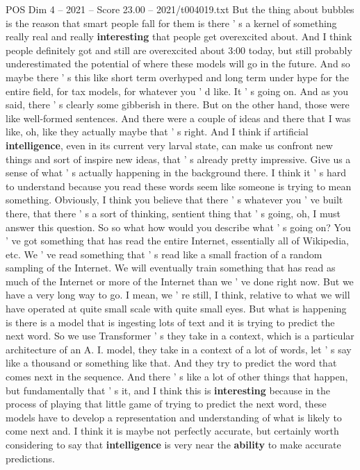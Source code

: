 \begin{textsample}{POS Dim 4 – 2021 – Score 23.00 – 2021/t004019.txt}
But the thing about bubbles is the reason that smart people fall for them is there ' s a kernel of something really real and really \textbf{interesting} that people get overexcited about.
And I think people definitely got and still are overexcited about 3:00 today, but still probably underestimated the potential of where these models will go in the future.
And so maybe there ' s this like short term overhyped and long term under hype for the entire field, for tax models, for whatever you ' d like.
It ' s going on.
And as you said, there ' s clearly some gibberish in there.
But on the other hand, those were like well-formed sentences.
And there were a couple of ideas and there that I was like, oh, like they actually maybe that ' s right.
And I think if artificial \textbf{intelligence}, even in its current very larval state, can make us confront new things and sort of inspire new ideas, that ' s already pretty impressive.
Give us a sense of what ' s actually happening in the background there.
I think it ' s hard to understand because you read these words seem like someone is trying to mean something.
Obviously, I think you believe that there ' s whatever you ' ve built there, that there ' s a sort of thinking, sentient thing that ' s going, oh, I must answer this question.
So so what how would you describe what ' s going on?
You ' ve got something that has read the entire Internet, essentially all of Wikipedia, etc.
We ' ve read something that ' s read like a small fraction of a random sampling of the Internet.
We will eventually train something that has read as much of the Internet or more of the Internet than we ' ve done right now.
But we have a very long way to go.
I mean, we ' re still, I think, relative to what we will have operated at quite small scale with quite small eyes.
But what is happening is there is a model that is ingesting lots of text and it is trying to predict the next word.
So we use Transformer ' s they take in a context, which is a particular architecture of an A.
I. model, they take in a context of a lot of words, let ' s say like a thousand or something like that.
And they try to predict the word that comes next in the sequence.
And there ' s like a lot of other things that happen, but fundamentally that ' s it, and I think this is \textbf{interesting} because in the process of playing that little game of trying to predict the next word, these models have to develop a representation and understanding of what is likely to come next and.
I think it is maybe not perfectly accurate, but certainly worth considering to say that \textbf{intelligence} is very near the \textbf{ability} to make accurate predictions.

\end{textsample}
